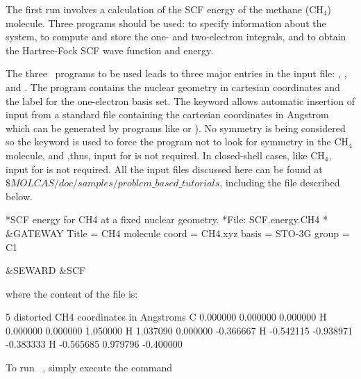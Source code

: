 The first run involves a calculation of the SCF energy of the methane
(CH$_4$) molecule. Three programs should be used:  to specify 
information about the system,  to compute
and store the one- and two-electron integrals, and  to obtain
the Hartree-Fock SCF wave function and energy.  

The three \molcas\ programs to 
be used leads to three major entries in the input file: , , and .
The  program contains the nuclear geometry in cartesian
coordinates and the label for the one-electron basis set.
The keyword  allows automatic insertion of  input from a standard
file containing the cartesian coordinates in Angstrom which can be generated by
programs like  or ). 
No symmetry is being considered so the keyword  is used to force the program not 
to look for symmetry in the CH$_4$ molecule, and ,thus, input for  is not required. 
In closed-shell cases, like CH$_4$, input for  is not required. All the input
files discussed here can be found at {$\$MOLCAS/doc/samples/problem\_based\_tutorials$}, including the file
 described below.

\begin{inputlisting}
*SCF energy for CH4 at a fixed nuclear geometry.
*File: SCF.energy.CH4
*
&GATEWAY
 Title = CH4 molecule
 coord  = CH4.xyz 
 basis = STO-3G 
 group = C1

&SEWARD                                                                                                                                                                             
&SCF
\end{inputlisting}

where the content of the  file is: 

\begin{inputlisting}
5
distorted CH4 coordinates in Angstroms 
C    0.000000     0.000000     0.000000
H    0.000000     0.000000     1.050000
H    1.037090     0.000000    -0.366667
H   -0.542115    -0.938971    -0.383333
H   -0.565685     0.979796    -0.400000
\end{inputlisting}

To run \molcas\ , simply execute the command

